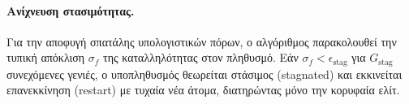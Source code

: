 \paragraph{Ανίχνευση στασιμότητας.}
Για την αποφυγή σπατάλης υπολογιστικών πόρων, ο αλγόριθμος παρακολουθεί την τυπική απόκλιση $\sigma_f$ της καταλληλότητας στον πληθυσμό. Εάν $\sigma_f < \epsilon_{\text{stag}}$ για $G_{\text{stag}}$ συνεχόμενες γενιές, ο υποπληθυσμός θεωρείται στάσιμος (stagnated) και εκκινείται επανεκκίνηση (restart) με τυχαία νέα άτομα, διατηρώντας μόνο την κορυφαία ελίτ.
